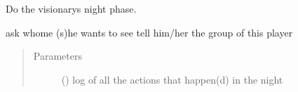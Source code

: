 \documentclass[letterpaper,10pt,english]{sphinxmanual}
\begin{document}
\begin{fulllineitems}
\begin{fulllineitems}
\begin{quote}
\begin{description}
\end{description}\end{quote}

\end{fulllineitems}



\begin{fulllineitems}
\end{fulllineitems}



\begin{fulllineitems}
Do the visionarys night phase.

ask whome (s)he wants to see
tell him/her the group of this player
\begin{quote}\begin{description}
\item[{Parameters}] \leavevmode
{} ({\hyperref[\detokenize{chatwolf:chatwolf.nightactions.Nightactions}]{}}) \textendash{} log of all the actions that happen(d) in the night

\end{description}\end{quote}

\end{fulllineitems}


\end{fulllineitems}
\end{document}
